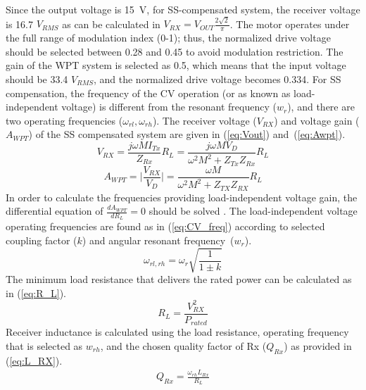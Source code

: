 \documentclass[journal]{IEEEtran}
\begin{document}
Since the output voltage is 15~V,  for SS-compensated system, the receiver voltage is 16.7 $V_{RMS}$ as can be calculated in  $V_{RX} =  V_{OUT}\frac{2\sqrt{2}}{\pi}$.
The motor operates under the full range of modulation index (0-1); thus, the normalized drive voltage should be selected between 0.28 and 0.45 to avoid modulation restriction.
The gain of the WPT system is selected as 0.5, which means that the input voltage should be 33.4 $V_{RMS}$, and the normalized drive voltage becomes 0.334.
For SS compensation, the frequency of the  CV operation (or as known as load-independent voltage) is different from the resonant frequency ($w_r$), and there are two operating frequencies ($\omega_{rl}, \omega_{rh}$).
The receiver voltage ($V_{RX}$) and voltage gain ($A_{WPT}$) of the SS compensated system are given in (\ref{eq:Vout}) and~(\ref{eq:Awpt}). 
\begin{equation}
\label{eq:Vout}
    V_{RX} =  \frac{j\omega M I_{Tx}}{Z_{Rx}}R_L  = \frac{j\omega M V_{D}}{\omega^2M^2+Z_{Tx}Z_{Rx}}R_L
\end{equation}
\begin{equation}
\label{eq:Awpt}
    A_{WPT} =  \bigg|\frac{V_{RX}}{V_{D}}\bigg| = \frac{\omega M}{\omega^2M^2+Z_{TX}Z_{RX}} R_L
\end{equation}
In order to calculate the frequencies providing load-independent voltage gain, the differential equation of $\frac{dA_{WPT}}{d  R_L} =0$ should be solved \cite{CV}. 
The load-independent voltage operating frequencies are found as in (\ref{eq:CV_freq}) according to selected coupling factor ($k$) and angular resonant frequency~($w_r$).
\begin{equation}
\label{eq:CV_freq}
    \omega_{rl,rh} =  \omega_r \sqrt{\frac{1}{1 \pm k}} 
\end{equation}
The minimum load resistance that delivers the rated power can be calculated as in (\ref{eq:R_L}). 
\begin{equation}
\label{eq:R_L}
   R_L= \frac{V_{RX}^2}{P_{rated}}
\end{equation}
Receiver inductance is calculated using the load resistance, operating frequency that is selected as $w_{rh}$, and the chosen quality factor of Rx ($Q_{Rx}$) as provided in (\ref{eq:L_RX}). 
\begin{equation}
\label{eq:L_RX}
\begin{split}
     Q_{Rx}= \frac{\omega_{rh}L_{Rx}}{R_L} 
\end{split}
\end{equation}
\end{document}
